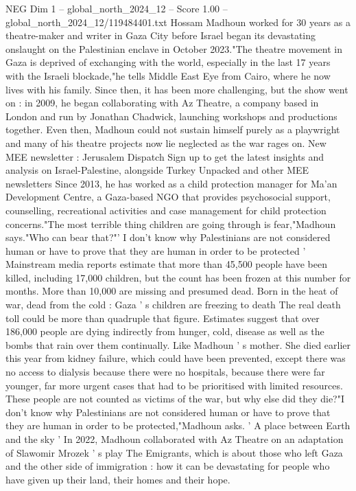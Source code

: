 \begin{textsample}{NEG Dim 1 – global\_north\_2024\_12 – Score 1.00 – global\_north\_2024\_12/119484401.txt}  \label{ex:f1_neg_191}
Hossam Madhoun worked for 30 years as a theatre-maker and writer in Gaza City before Israel began its devastating onslaught on the Palestinian enclave in October 2023."The theatre movement in Gaza is deprived of exchanging with the world, especially in the last 17 years with the Israeli blockade,"he tells Middle East Eye from Cairo, where he now lives with his family.
Since then, it has been more challenging, but the show went on : in 2009, he began collaborating with Az Theatre, a company based in London and run by Jonathan Chadwick, launching workshops and productions together.
Even then, Madhoun could not sustain himself purely as a playwright and many of his theatre projects now lie neglected as the war rages on.
New MEE newsletter : Jerusalem Dispatch Sign up to get the latest insights and analysis on Israel-Palestine, alongside Turkey Unpacked and other MEE newsletters Since 2013, he has worked as a child protection manager for Ma'an Development Centre, a Gaza-based NGO that provides psychosocial support, counselling, recreational activities and case management for child protection concerns."The most terrible thing children are going through is fear,"Madhoun says."Who can bear that?"' I don't know why Palestinians are not considered human or have to prove that they are human in order to be protected ' Mainstream media reports estimate that more than 45,500 people have been killed, including 17,000 children, but the count has been frozen at this number for months.
More than 10,000 are missing and presumed dead.
Born in the heat of war, dead from the cold : Gaza ' s children are freezing to death The real death toll could be more than quadruple that figure.
Estimates suggest that over 186,000 people are dying indirectly from hunger, cold, disease as well as the bombs that rain over them continually.
Like Madhoun ' s mother.
She died earlier this year from kidney failure, which could have been prevented, except there was no access to dialysis because there were no hospitals, because there were far younger, far more urgent cases that had to be prioritised with limited resources.
These people are not counted as victims of the war, but why else did they die?"I don't know why Palestinians are not considered human or have to prove that they are human in order to be protected,"Madhoun asks. ' A place between Earth and the sky ' In 2022, Madhoun collaborated with Az Theatre on an adaptation of Slawomir Mrozek ' s play The Emigrants, which is about those who left Gaza and the other side of immigration : how it can be devastating for people who have given up their land, their homes and their hope.

\end{textsample}
